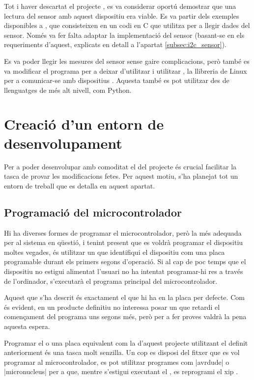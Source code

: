 Tot i haver descartat el projecte , es va considerar
oportú demostrar que una lectura del sensor amb aquest dispositiu era viable.
Es va partir dels exemples disponibles a \cite{I2cTinyUsb}, que consisteixen en
un codi en C que utilitza  per a llegir dades del sensor. Només va
fer falta adaptar la implementació del sensor (basant-se en els requeriments
d'aquest, explicats en detall a l'apartat \ref{subsec:i2c_sensor}).

Es va poder llegir les mesures del sensor sense gaire complicacions, però també
es va modificar el programa per a deixar d'utilitzar  i utilitzar
, la llibreria de Linux per a comunicar-se amb dispositius
. Aquesta també es pot utilitzar des de llenguatges de més alt nivell,
com Python.

\section{Creació d'un entorn de desenvolupament}

Per a poder desenvolupar amb comoditat el  del projecte és crucial
facilitar la tasca de provar les modificacions fetes. Per aquest motiu, s'ha
planejat tot un entorn de treball que es detalla en aquest apartat.

\subsection{Programació del microcontrolador}
\label{subsec:bootloader}

Hi ha diverses formes de programar el microcontrolador, però la més adequada
per al sistema en qüestió, i tenint present que es voldrà programar el dispositiu
moltes vegades, és utilitzar un  que identifiqui el dispositiu
com una placa programable durant els primers segons d'operació. Si al cap de
poc temps que el dispositiu no estigui alimentat l'usuari no ha intentat
programar-hi res a través de l'ordinador, s'executarà el programa principal
del microcontrolador.

Aquest  que s'ha descrit és exactament el que hi ha en la
placa  per defecte. Com és evident, en un producte definitiu no
interessa posar un  que retardi el començament del programa
uns segons més, però per a fer proves valdrà la pena aquesta espera.

Programar el  o una placa equivalent com la d'aquest projecte
utilitzant el  definit anteriorment és una tasca molt senzilla.
Un cop es disposi del fitxer  que es vol programar al
microcontrolador, es pot utilitzar programes com \ord|avrdude| o
\est|micronucleus| per a que, mentre s'estigui executant el , es 
reprogrami el xip \cite{DigisparkBootloader}.

